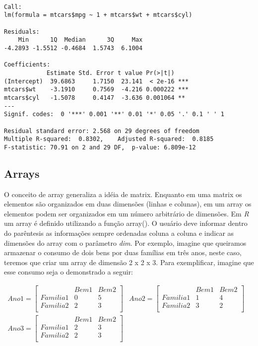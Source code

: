 \documentclass[
  letterpaper,
  DIV=11,
  numbers=noendperiod]{scrreprt}
\begin{document}
\begin{verbatim}

Call:
lm(formula = mtcars$mpg ~ 1 + mtcars$wt + mtcars$cyl)

Residuals:
    Min      1Q  Median      3Q     Max 
-4.2893 -1.5512 -0.4684  1.5743  6.1004 

Coefficients:
            Estimate Std. Error t value Pr(>|t|)    
(Intercept)  39.6863     1.7150  23.141  < 2e-16 ***
mtcars$wt    -3.1910     0.7569  -4.216 0.000222 ***
mtcars$cyl   -1.5078     0.4147  -3.636 0.001064 ** 
---
Signif. codes:  0 '***' 0.001 '**' 0.01 '*' 0.05 '.' 0.1 ' ' 1

Residual standard error: 2.568 on 29 degrees of freedom
Multiple R-squared:  0.8302,    Adjusted R-squared:  0.8185 
F-statistic: 70.91 on 2 and 29 DF,  p-value: 6.809e-12
\end{verbatim}

\subsection{Arrays}\label{arrays}

O conceito de array generaliza a idéia de matrix. Enquanto em uma matrix
os elementos são organizados em duas dimensões (linhas e colunas), em um
array os elementos podem ser organizados em um número arbitrário de
dimensões. Em \emph{R} um array é definido utilizando a função array().
O usuário deve informar dentro do parêntesis as informações sempre
ordenadas coluna a coluna e indicar as dimensões do array com o
parâmetro \emph{dim}. Por exemplo, imagine que queiramos armazenar o
consumo de dois bens por duas famílias em três anos, neste caso, teremos
que criar um array de dimensão 2 x 2 x 3. Para exemplificar, imagine que
esse consumo seja o demonstrado a seguir:

\[
\begin{array}{ccc}
Ano 1 = \left[
\begin{array}{c|cc}
& Bem 1 & Bem 2 \\ \hline
Familia 1 & 0 & 5\\
Familia 2 & 2 & 3\\
\end{array}
\right]
&
Ano 2 = \left[
\begin{array}{c|cc}
& Bem 1 & Bem 2 \\ \hline
Familia 1 & 1 & 4\\
Familia 2 & 3 & 2\\
\end{array}
\right]
&\\
Ano 3 = \left[
\begin{array}{c|cc}
& Bem 1 & Bem 2 \\ \hline
Familia 1 & 2 & 3\\
Familia 2 & 2 & 3\\
\end{array}
\right]
\end{array}
\]
\end{document}
